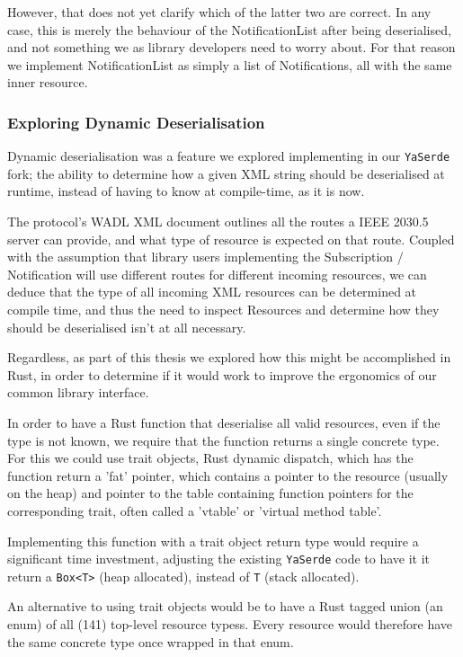 However, that does not yet clarify which of the latter two are correct. In any case, this is merely the behaviour of the NotificationList after being deserialised, and not something we as library developers need to worry about. For that reason we implement NotificationList as simply a list of Notifications, all with the same inner resource.

\subsubsection{Exploring Dynamic Deserialisation}
Dynamic deserialisation was a feature we explored implementing in our \texttt{YaSerde} fork; the ability to determine how a given XML string should be deserialised at runtime, instead of having to know at compile-time, as it is now.

The protocol's WADL XML document outlines all the routes a IEEE 2030.5 server can provide, and what type of resource is expected on that route. Coupled with the assumption that library users implementing the Subscription / Notification will use different routes for different incoming resources, we can deduce that the type of all incoming XML resources can be determined at compile time, and thus the need to inspect Resources and determine how they should be deserialised isn't at all necessary. 

Regardless, as part of this thesis we explored how this might be accomplished in Rust, in order to determine if it would work to improve the ergonomics of our common library interface.

In order to have a Rust function that deserialise all valid resources, even if the type is not known, we require that the function returns a single concrete type. For this we could use trait objects, Rust dynamic dispatch, which has the function return a 'fat' pointer, which contains a pointer to the resource (usually on the heap) and pointer to the table containing function pointers for the corresponding trait, often called a 'vtable' or 'virtual method table'. 

Implementing this function with a trait object return type would require a significant time investment, adjusting the existing \texttt{YaSerde} code to have it it return a \texttt{Box<T>} (heap allocated), instead of \texttt{T} (stack allocated).

An alternative to using trait objects would be to have a Rust tagged union (an enum) of all (141) top-level resource typess. Every resource would therefore have the same concrete type once wrapped in that enum.

